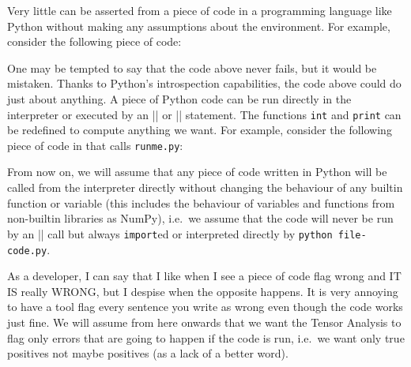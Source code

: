 Very little can be asserted from a piece of code in a programming
language like Python without making any assumptions about the
environment. For example, consider the following piece of code:

\begin{Shaded}
\begin{Highlighting}[]
\OperatorTok{=} \NormalTok{(}\NormalTok{) }\OperatorTok{+} 
\NormalTok{(}\NormalTok{)}
\OperatorTok{==} 
\end{Highlighting}
\end{Shaded}

One may be tempted to say that the code above never fails, but it would
be mistaken. Thanks to Python's introspection capabilities, the code
above could do just about anything. A piece of Python code can be run
directly in the interpreter or executed by an \VERB||
or \VERB|| statement. The functions \texttt{int} and
\texttt{print} can be redefined to compute anything we want. For
example, consider the following piece of code in that calls
\texttt{runme.py}:

\begin{Shaded}
\begin{Highlighting}[]
\OperatorTok{=} \NormalTok{(}
\OperatorTok{=} 
\OperatorTok{+}
\end{Highlighting}
\end{Shaded}

From now on, we will assume that any piece of code written in Python
will be called from the interpreter directly without changing the
behaviour of any builtin function or variable (this includes the
behaviour of variables and functions from non-builtin libraries as
NumPy), i.e.~we assume that the code will never be run by an
\VERB|| call but always \texttt{import}ed or
interpreted directly by \texttt{python\ file-code.py}.

As a developer, I can say that I like when I see a piece of code flag
wrong and IT IS really WRONG, but I despise when the opposite happens.
It is very annoying to have a tool flag every sentence you write as
wrong even though the code works just fine. We will assume from here
onwards that we want the Tensor Analysis to flag only errors that are
going to happen if the code is run, i.e.~we want only true positives not
maybe positives (as a lack of a better word).

